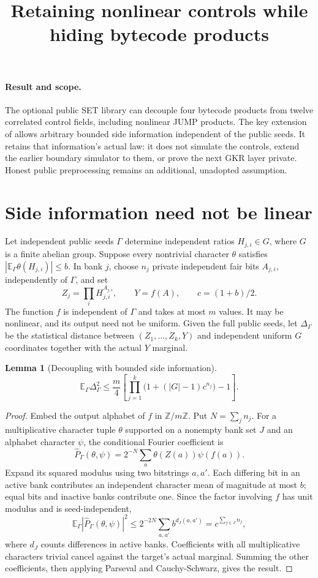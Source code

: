 \documentclass[11pt]{article}
\title{Retaining nonlinear controls while hiding bytecode products}
\author{}
\date{}
\newtheorem{lemma}{Lemma}
\begin{document}
\maketitle
\vspace{-2em}

\paragraph{Result and scope.} The optional public SET library can decouple four bytecode products from twelve correlated control fields, including nonlinear JUMP products. The key extension of  allows arbitrary bounded side information independent of the public seeds. It retains that information's actual law: it does not simulate the controls, extend the earlier boundary simulator to them, or prove the next GKR layer private. Honest public preprocessing remains an additional, unadopted assumption.

\section{Side information need not be linear}

Let independent public seeds $\Gamma$ determine independent ratios $H_{j,i}\in G$, where $G$ is a finite abelian group. Suppose every nontrivial character $\theta$ satisfies $|\mathbb E_\Gamma\theta(H_{j,i})|\le b$. In bank $j$, choose $n_j$ private independent fair bits $A_{j,i}$, independently of $\Gamma$, and set
\[
 Z_j=\prod_i H_{j,i}^{A_{j,i}},\qquad
 Y=f(A),\qquad c=(1+b)/2.
\]
The function $f$ is independent of $\Gamma$ and takes at most $m$ values. It may be nonlinear, and its output need not be uniform. Given the full public seeds, let $\Delta_\Gamma$ be the statistical distance between $(Z_1,\ldots,Z_k,Y)$ and independent uniform $G$ coordinates together with the actual $Y$ marginal.

\begin{lemma}[Decoupling with bounded side information]
\[
 \mathbb E_\Gamma\Delta_\Gamma^2\le
 \frac m4\left[\prod_{j=1}^k\bigl(1+(|G|-1)c^{n_j}\bigr)-1\right].
\]
\end{lemma}
\begin{proof}
Embed the output alphabet of $f$ in $\mathbb Z/m\mathbb Z$. Put $N=\sum_j n_j$. For a multiplicative character tuple $\theta$ supported on a nonempty bank set $J$ and an alphabet character $\psi$, the conditional Fourier coefficient is
\[
 \widehat P_\Gamma(\theta,\psi)
 =2^{-N}\sum_a\theta(Z(a))\psi(f(a)).
\]
Expand its squared modulus using two bitstrings $a,a'$. Each differing bit in an active bank contributes an independent character mean of magnitude at most $b$; equal bits and inactive banks contribute one. Since the factor involving $f$ has unit modulus and is seed-independent,
\[
 \mathbb E_\Gamma|\widehat P_\Gamma(\theta,\psi)|^2
 \le 2^{-2N}\sum_{a,a'}b^{d_J(a,a')}
 =c^{\sum_{j\in J}n_j},
\]
where $d_J$ counts differences in active banks. Coefficients with all multiplicative characters trivial cancel against the target's actual marginal. Summing the other coefficients, then applying Parseval and Cauchy-Schwarz, gives the result.
\end{proof}
\end{document}
